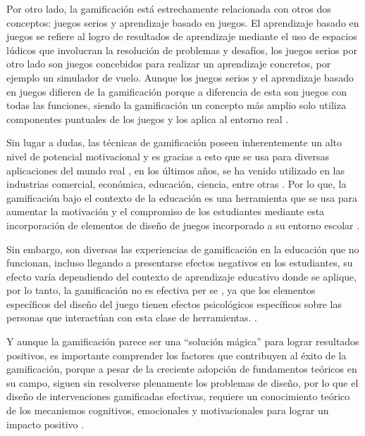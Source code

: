 Por otro lado, la gamificación está estrechamente relacionada con otros dos conceptos: juegos serios y 
aprendizaje basado en juegos. El aprendizaje basado en juegos se refiere al logro de resultados de aprendizaje
mediante el uso de espacios lúdicos que involucran la resolución de problemas y desafíos, los juegos serios
por otro lado son juegos concebidos para realizar un aprendizaje concretos, por ejemplo un simulador de vuelo.
Aunque los juegos serios y el aprendizaje basado en juegos difieren de la gamificación porque a diferencia de
esta son juegos con todas las funciones, siendo la gamificación un concepto más amplio solo utiliza 
componentes puntuales de los juegos y los aplica al entorno real \cite{KRATH2021106963}.

Sin lugar a dudas, las técnicas de gamificación poseen inherentemente un alto nivel de potencial motivacional
y es gracias a esto que se usa para diversas aplicaciones del mundo real \cite{SAILER2017371}, en los últimos 
años, se ha venido utilizado en las industrias comercial, económica, educación, ciencia, entre otras 
\cite{XU2017}. Por lo que, la gamificación bajo el contexto de la educación es una herramienta que se usa para
aumentar la motivación y el compromiso de los estudiantes mediante esta incorporación de elementos de diseño de 
juegos incorporado a su entorno escolar \cite{Li2020}.

Sin embargo, son diversas las experiencias de gamificación en la educación que no funcionan, incluso llegando
a presentarse efectos negativos en los estudiantes, su efecto varía dependiendo del contexto de
aprendizaje educativo donde se aplique, por lo tanto, la gamificación no es efectiva per se 
\cite{KRATH2021106963}, ya que los elementos específicos del diseño del juego tienen efectos psicológicos 
específicos sobre las personas que interactúan con esta clase de herramientas. \cite{SAILER2017371}.

Y aunque la gamificación parece ser una ``solución mágica'' para lograr resultados positivos, es importante
comprender los factores que contribuyen al éxito de la gamificación, porque a pesar de la creciente adopción
de fundamentos teóricos en su campo, siguen sin resolverse plenamente los problemas de diseño, por lo que el
diseño de intervenciones gamificadas efectivas, requiere un conocimiento teórico de los mecanismos cognitivos,
emocionales y motivacionales para lograr un impacto positivo \cite{KRATH2021106963}.

